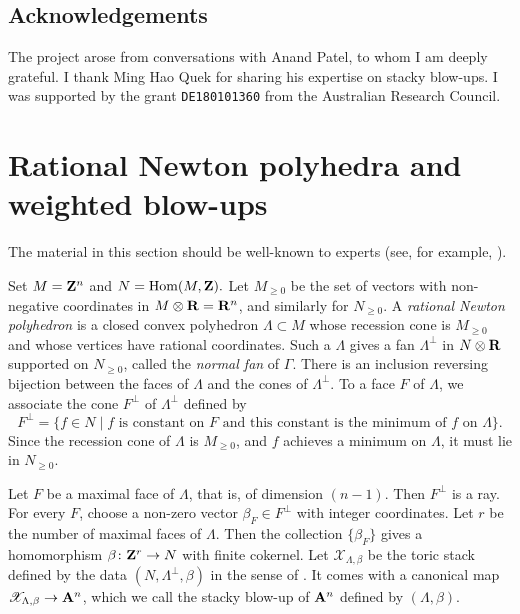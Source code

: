 \documentclass{amsart}
\begin{document}
\subsection*{Acknowledgements}
The project arose from conversations with Anand Patel, to whom I am deeply grateful.
I thank Ming Hao Quek for sharing his expertise on stacky blow-ups.
I was supported by the grant \texttt{DE180101360} from the Australian Research Council.

\section{Rational Newton polyhedra and weighted blow-ups}\label{sec:stackyblowup}
The material in this section should be well-known to experts (see, for example, \cite[\S~2]{que:24}).

Set \(M = {\bf Z}^n\) and \(N = \operatorname{Hom}(M,{\bf Z}).\)
Let \(M_{\geq 0}\) be the set of vectors with non-negative coordinates in \(M \otimes {\bf R} = {\bf R}^n\), and similarly for \(N_{\geq 0}\).
A \emph{rational Newton polyhedron} is a closed convex polyhedron \(\Lambda \subset M\) whose recession cone is \(M_{\geq 0}\) and whose vertices have rational coordinates.
Such a \(\Lambda\) gives a fan \(\Lambda^\perp\) in \(N \otimes {\bf R}\) supported on \(N_{\geq 0}\), called the \emph{normal fan} of \(\Gamma\).
There is an inclusion reversing bijection between the faces of \(\Lambda\) and the cones of \(\Lambda^\perp\).
To a face \(F\) of \(\Lambda\), we associate the cone \(F^{\perp}\) of \(\Lambda^{\perp}\) defined by
\[ F^{\perp}  = \{f \in N \mid f \text{ is constant on } F \text{ and this constant is the minimum of }f\text{ on } \Lambda\}.\]
Since the recession cone of \(\Lambda\) is \(M_{\geq 0}\), and \(f\) achieves a minimum on \(\Lambda\), it must lie in \(N_{\geq 0}\).

Let \(F\) be a maximal face of \(\Lambda\), that is, of dimension \((n-1)\).
Then \(F^{\perp}\) is a ray.
For every \(F\), choose a non-zero vector \(\beta_{F} \in F^{\perp}\) with integer coordinates.
Let \(r\) be the number of maximal faces of \(\Lambda\).
Then the collection \(\{\beta_F\}\) gives a homomorphism \(\beta \colon {\bf Z}^r \to N\) with finite cokernel.
Let \(\mathscr X_{\Lambda, \beta}\) be the toric stack defined by the data \((N, \Lambda^\perp, \beta)\) in the sense of \cite{bor.che.smi:05}.
It comes with a canonical map \(\mathscr X_{\Lambda, \beta} \to {\bf A}^n\), which we call the stacky blow-up of \({\bf A}^n\) defined by \((\Lambda,\beta)\).
\end{document}
